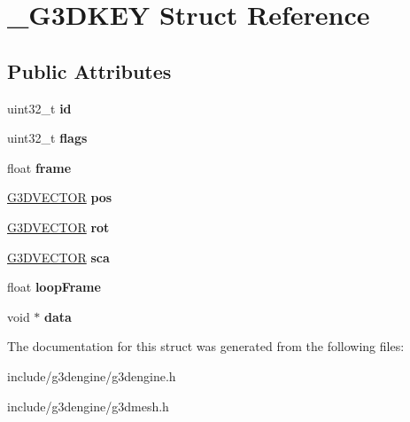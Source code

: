 \hypertarget{struct__G3DKEY}{}\section{\+\_\+\+G3\+D\+K\+EY Struct Reference}
\label{struct__G3DKEY}
\subsection*{Public Attributes}
\begin{DoxyCompactItemize}
\item 
\mbox{\label{struct__G3DKEY_a43bc7d3547652af28482552627ec2350}} 
uint32\+\_\+t {\bfseries id}
\item 
\mbox{\label{struct__G3DKEY_a3944f2113407995b405cc4268423bc9f}} 
uint32\+\_\+t {\bfseries flags}
\item 
\mbox{\label{struct__G3DKEY_abea416321d993febf69bc8c40c1832b0}} 
float {\bfseries frame}
\item 
\mbox{\label{struct__G3DKEY_a0b90d803b6364ddce5c29641937d9d36}} 
\hyperlink{structG3DVECTOR}{G3\+D\+V\+E\+C\+T\+OR} {\bfseries pos}
\item 
\mbox{\label{struct__G3DKEY_a33ea9fd4b842cf89a75c6859d55c7a67}} 
\hyperlink{structG3DVECTOR}{G3\+D\+V\+E\+C\+T\+OR} {\bfseries rot}
\item 
\mbox{\label{struct__G3DKEY_a47c46133644851aa69e9284ceff91508}} 
\hyperlink{structG3DVECTOR}{G3\+D\+V\+E\+C\+T\+OR} {\bfseries sca}
\item 
\mbox{\label{struct__G3DKEY_ab1e1871f1fd3235943bff0f9a3588a45}} 
float {\bfseries loop\+Frame}
\item 
\mbox{\label{struct__G3DKEY_a46b58ceb251c2d4f490eee5bc81ee26b}} 
void $\ast$ {\bfseries data}
\end{DoxyCompactItemize}


The documentation for this struct was generated from the following files\+:\begin{DoxyCompactItemize}
\item 
include/g3dengine/g3dengine.\+h\item 
include/g3dengine/g3dmesh.\+h\end{DoxyCompactItemize}
